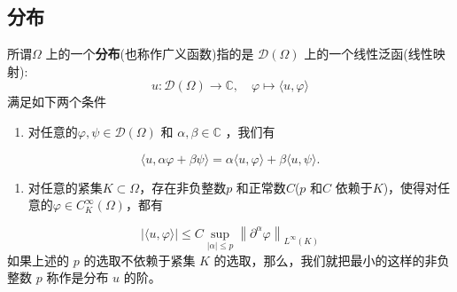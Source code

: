 \subsection{分布}

\begin{definition}[分布]
所谓$\Omega$ 上的一个\textbf{分布}(也称作广义函数)指的是 $\mathcal{D}(\Omega)$ 上的一个线性泛函(线性映射):
\[
u: \mathcal{D}(\Omega) \rightarrow \mathbb{C}, \quad \varphi \mapsto\langle u, \varphi\rangle
\]满足如下两个条件
	\begin{enumerate}
		\item 对任意的$\varphi, \psi \in \mathcal{D}(\Omega)$ 和 $\alpha, \beta \in \mathbb{C}$ ，我们有
	\end{enumerate}
\[
\langle u, \alpha \varphi+\beta \psi\rangle=\alpha\langle u, \varphi\rangle+\beta\langle u, \psi\rangle .
\]	\begin{enumerate}
		\item 对任意的紧集$K \subset \Omega$，存在非负整数$p$ 和正常数$C$($p$ 和$C$ 依赖于$K$)，使得对任意的$\varphi \in C_K^{\infty}(\Omega)$，都有
	\end{enumerate}
\[
|\langle u, \varphi\rangle| \leqslant C \sup _{|\alpha| \leqslant p}\left\|\partial^\alpha \varphi\right\|_{L^{\infty}(K)}
\]如果上述的 $p$ 的选取不依赖于紧集 $K$ 的选取，那么，我们就把最小的这样的非负整数 $p$ 称作是分布 $u$ 的阶。\label{1d3091}
\end{definition}

